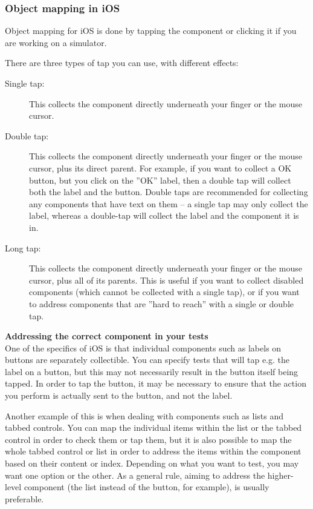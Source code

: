 \subsubsection{Object mapping in iOS \gdauts{}}
Object mapping for iOS \gdauts{} is done by tapping the component or clicking it if you are working on a simulator.

There are three types of tap you can use, with different effects:
\begin{description}
\item [Single tap:]{This collects the component directly underneath your finger or the mouse cursor.}
\item [Double tap:]{This collects the component directly underneath your finger or the mouse cursor, plus its direct parent. For example, if you want to collect a OK button, but you click on the ''OK'' label, then a double tap will collect both the label and the button. Double taps are recommended for collecting any components that have text on them -- a single tap may only collect the label, whereas a double-tap will collect the label and the component it is in.}
\item [Long tap:]{This collects the component directly underneath your finger or the mouse cursor, plus all of its parents. This is useful if you want to collect disabled components (which cannot be collected with a single tap), or if you want to address components that are ''hard to reach'' with a single or double tap.}
\end{description}


\textbf{Addressing the correct component in your tests}\\
\label{ToolkitiOSCorrectComponent}
One of the specifics of iOS \gdauts{} is that individual components such as labels on buttons are separately collectible. You can specify tests that will tap e.g. the label on a button, but this may not necessarily result in the button itself being tapped. In order to tap the button, it may be necessary to ensure that the action you perform is actually sent to the button, and not the label. 

Another example of this is when dealing with components such as lists and tabbed controls. You can map the individual items within the list or the tabbed control in order to check them or tap them, but it is also possible to map the whole tabbed control or list in order to address the items within the component based on their content or index. Depending on what you want to test, you may want one option or the other. As a general rule, aiming to address the higher-level component (the list instead of the button, for example), is usually preferable. 


